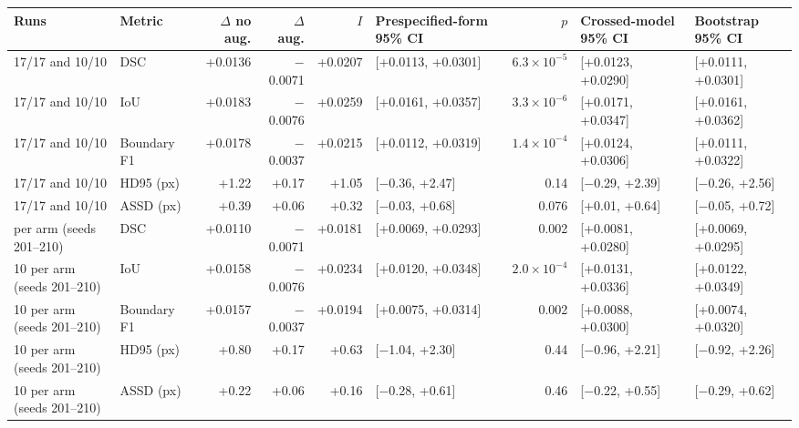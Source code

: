 \begin{tabular}{llrrrlrll}
\toprule
Runs & Metric & $\Delta$ no aug. & $\Delta$ aug. & $I$ & Prespecified-form 95\% CI & $p$ & Crossed-model 95\% CI & Bootstrap 95\% CI \\
\midrule
17/17 and 10/10 & DSC & +0.0136 & $-$0.0071 & +0.0207 & [+0.0113, +0.0301] & $6.3\times10^{-5}$ & [+0.0123, +0.0290] & [+0.0111, +0.0301] \\
17/17 and 10/10 & IoU & +0.0183 & $-$0.0076 & +0.0259 & [+0.0161, +0.0357] & $3.3\times10^{-6}$ & [+0.0171, +0.0347] & [+0.0161, +0.0362] \\
17/17 and 10/10 & Boundary F1 & +0.0178 & $-$0.0037 & +0.0215 & [+0.0112, +0.0319] & $1.4\times10^{-4}$ & [+0.0124, +0.0306] & [+0.0111, +0.0322] \\
17/17 and 10/10 & HD95 (px) & +1.22 & +0.17 & +1.05 & [$-$0.36, +2.47] & 0.14 & [$-$0.29, +2.39] & [$-$0.26, +2.56] \\
17/17 and 10/10 & ASSD (px) & +0.39 & +0.06 & +0.32 & [$-$0.03, +0.68] & 0.076 & [+0.01, +0.64] & [$-$0.05, +0.72] \\
\addlinespace
10 per arm (seeds 201--210) & DSC & +0.0110 & $-$0.0071 & +0.0181 & [+0.0069, +0.0293] & 0.002 & [+0.0081, +0.0280] & [+0.0069, +0.0295] \\
10 per arm (seeds 201--210) & IoU & +0.0158 & $-$0.0076 & +0.0234 & [+0.0120, +0.0348] & $2.0\times10^{-4}$ & [+0.0131, +0.0336] & [+0.0122, +0.0349] \\
10 per arm (seeds 201--210) & Boundary F1 & +0.0157 & $-$0.0037 & +0.0194 & [+0.0075, +0.0314] & 0.002 & [+0.0088, +0.0300] & [+0.0074, +0.0320] \\
10 per arm (seeds 201--210) & HD95 (px) & +0.80 & +0.17 & +0.63 & [$-$1.04, +2.30] & 0.44 & [$-$0.96, +2.21] & [$-$0.92, +2.26] \\
10 per arm (seeds 201--210) & ASSD (px) & +0.22 & +0.06 & +0.16 & [$-$0.28, +0.61] & 0.46 & [$-$0.22, +0.55] & [$-$0.29, +0.62] \\
\bottomrule
\end{tabular}
